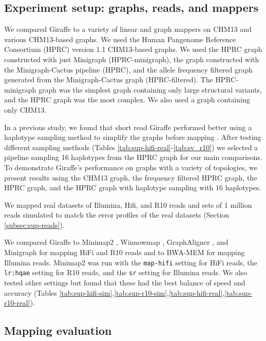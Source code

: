 \documentclass[11pt]{ucscthesis}
\begin{document}
\subsection{Experiment setup: graphs, reads, and mappers}

We compared Giraffe to a variety of linear and graph mappers on CHM13 and various CHM13-based graphs.
We used the Human Pangenome Reference Consortium (HPRC) version 1.1 CHM13-based graphs.
We used the HPRC graph constructed with just Minigraph (HPRC-minigraph), the graph constructed with the Minigraph-Cactus pipeline (HPRC), and the allele frequency filtered graph generated from the Minigraph-Cactus graph (HPRC-filtered)\cite{hprc_pangenome_2023}.
The HPRC-minigraph graph was the simplest graph containing only large structural variants, and the HPRC graph was the most complex.
We also used a graph containing only CHM13.

In a previous study, we found that short read Giraffe performed better using a haplotype sampling method to simplify the graphs before mapping \cite{siren_personalized_2024}.
After testing different sampling methods (Tables \ref{tab:sup-hifi-real}-\ref{tab:sv_r10}) we selected a pipeline sampling 16 haplotypes from the HPRC graph for our main comparisons.
To demonstrate Giraffe's performance on graphs with a variety of topologies, we present results using the CHM13 graph, the frequency filtered HPRC graph, the HPRC graph, and the HPRC graph with haplotype sampling with 16 haplotypes.

We mapped real datasets of Illumina, Hifi, and R10 reads and sets of 1 million reads simulated to match the error profiles of the real datasets (Section \ref{subsec:sup-reads}).

We compared Giraffe to Minimap2 \cite{minimap2_2021}, Winnowmap \cite{winnowmap2_2022}, GraphAligner \cite{rautiainen_bit-parallel_2019,rautiainen_graphaligner_2020}, and Minigraph \citep{li_minigraph_2020} for mapping HiFi and R10 reads and to BWA-MEM for mapping Illumina reads.
Minimap2 was run with the \texttt{map-hifi} setting for HiFi reads, the \texttt{lr:hqae} setting for R10 reads, and the \texttt{sr} setting for Illumina reads.
We also tested other settings but found that these had the best balance of speed and accuracy (Tables \ref{tab:sup-hifi-sim},\ref{tab:sup-r10-sim},\ref{tab:sup-hifi-real},\ref{tab:sup-r10-real}).

\subsection{Mapping evaluation}
\end{document}
